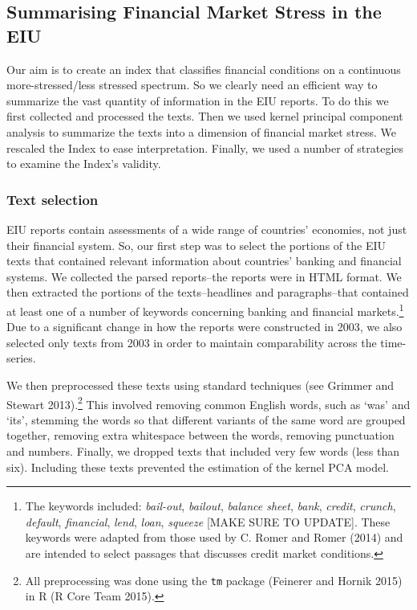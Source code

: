 \documentclass[]{article}
\let\rmarkdownfootnote\footnote%
\def\footnote{\protect\rmarkdownfootnote}
\begin{document}
\subsection{Summarising Financial Market Stress in the
EIU}\label{summarising-financial-market-stress-in-the-eiu}

Our aim is to create an index that classifies financial conditions on a
continuous more-stressed/less stressed spectrum. So we clearly need an
efficient way to summarize the vast quantity of information in the EIU
reports. To do this we first collected and processed the texts. Then we
used kernel principal component analysis to summarize the texts into a
dimension of financial market stress. We rescaled the Index to ease
interpretation. Finally, we used a number of strategies to examine the
Index's validity.

\subsubsection{Text selection}\label{text-selection}

EIU reports contain assessments of a wide range of countries' economies,
not just their financial system. So, our first step was to select the
portions of the EIU texts that contained relevant information about
countries' banking and financial systems. We collected the parsed
reports--the reports were in HTML format. We then extracted the portions
of the texts--headlines and paragraphs--that contained at least one of a
number of keywords concerning banking and financial markets.\footnote{The
  keywords included: \emph{bail-out}, \emph{bailout}, \emph{balance
  sheet}, \emph{bank}, \emph{credit}, \emph{crunch}, \emph{default},
  \emph{financial}, \emph{lend}, \emph{loan}, \emph{squeeze} {[}MAKE
  SURE TO UPDATE{]}. These keywords were adapted from those used by C.
  Romer and Romer (2014) and are intended to select passages that
  discusses credit market conditions.} Due to a significant change in
how the reports were constructed in 2003, we also selected only texts
from 2003 in order to maintain comparability across the time-series.

We then preprocessed these texts using standard techniques (see Grimmer
and Stewart 2013).\footnote{All preprocessing was done using the
  \texttt{tm} package (Feinerer and Hornik 2015) in R (R Core Team
  2015).} This involved removing common English words, such as `was' and
`its', stemming the words so that different variants of the same word
are grouped together, removing extra whitespace between the words,
removing punctuation and numbers. Finally, we dropped texts that
included very few words (less than six). Including these texts prevented
the estimation of the kernel PCA model.
\end{document}

